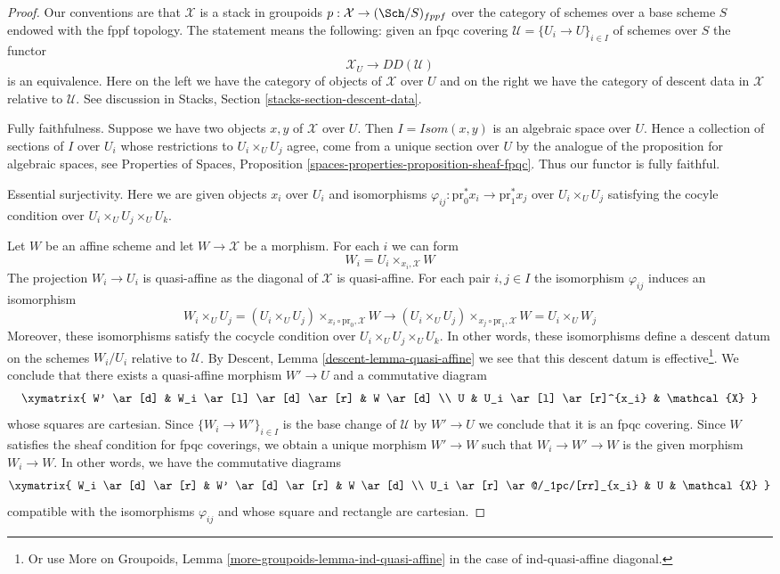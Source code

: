\begin{proof}
Our conventions are that $\mathcal{X}$ is a stack
in groupoids $p : \mathcal{X} \to (\Sch/S)_{fppf}$
over the category of schemes over a base scheme $S$ endowed
with the fppf topology. The statement means the following:
given an fpqc covering $\mathcal{U} = \{U_i \to U\}_{i \in I}$
of schemes over $S$ the functor
$$
\mathcal{X}_U \longrightarrow DD(\mathcal{U})
$$
is an equivalence. Here on the left we have the category
of objects of $\mathcal{X}$ over $U$ and on the right we have
the category of descent data in $\mathcal{X}$ relative to $\mathcal{U}$.
See discussion in Stacks, Section \ref{stacks-section-descent-data}.

\medskip\noindent
Fully faithfulness. Suppose we have two objects $x, y$ of $\mathcal{X}$
over $U$. Then $I = \mathit{Isom}(x, y)$ is an algebraic space over $U$.
Hence a collection of sections of $I$ over $U_i$ whose restrictions
to $U_i \times_U U_j$ agree, come from a unique section over $U$ by
the analogue of the proposition for algebraic spaces, see
Properties of Spaces, Proposition
\ref{spaces-properties-proposition-sheaf-fpqc}.
Thus our functor is fully faithful.

\medskip\noindent
Essential surjectivity. Here we are given objects
$x_i$ over $U_i$ and isomorphisms
$\varphi_{ij} : \text{pr}_0^*x_i \to \text{pr}_1^*x_j$
over $U_i \times_U U_j$ satisfying the cocyle condition
over $U_i \times_U U_j \times_U U_k$.

\medskip\noindent
Let $W$ be an affine scheme and let $W \to \mathcal{X}$
be a morphism. For each $i$ we can form
$$
W_i = U_i \times_{x_i, \mathcal{X}} W
$$
The projection $W_i \to U_i$ is quasi-affine as the
diagonal of $\mathcal{X}$ is quasi-affine. For each pair
$i, j \in I$ the isomorphism $\varphi_{ij}$ induces
an isomorphism
$$
W_i \times_U U_j =
(U_i \times_U U_j) \times_{x_i \circ \text{pr}_0, \mathcal{X}} W
\to
(U_i \times_U U_j) \times_{x_j \circ \text{pr}_1, \mathcal{X}} W =
U_i \times_U W_j
$$
Moreover, these isomorphisms satisfy the cocycle condition over
$U_i \times_U U_j \times_U U_k$. In other words, these isomorphisms
define a descent datum on the schemes $W_i/U_i$ relative to $\mathcal{U}$.
By Descent, Lemma \ref{descent-lemma-quasi-affine}
we see that this descent datum is effective\footnote{Or use
More on Groupoids, Lemma \ref{more-groupoids-lemma-ind-quasi-affine}
in the case of ind-quasi-affine diagonal.}.
We conclude that there exists a quasi-affine morphism
$W' \to U$ and a commutative diagram
$$
\xymatrix{
W' \ar[d] &
W_i \ar[l] \ar[d] \ar[r] &
W \ar[d] \\
U &
U_i \ar[l] \ar[r]^{x_i} &
\mathcal{X}
}
$$
whose squares are cartesian. Since $\{W_i \to W'\}_{i \in I}$
is the base change of $\mathcal{U}$ by $W' \to U$ we conclude
that it is an fpqc covering. Since $W$ satisfies the sheaf
condition for fpqc coverings, we obtain a unique morphism
$W' \to W$ such that $W_i \to W' \to W$ is the given morphism
$W_i \to W$. In other words, we have the commutative diagrams
$$
\xymatrix{
W_i \ar[d] \ar[r] &
W' \ar[d] \ar[r] &
W \ar[d] \\
U_i \ar[r] \ar@/_1pc/[rr]_{x_i} &
U &
\mathcal{X}
}
$$
compatible with the isomorphisms $\varphi_{ij}$ and whose
square and rectangle are cartesian.


\end{proof}
